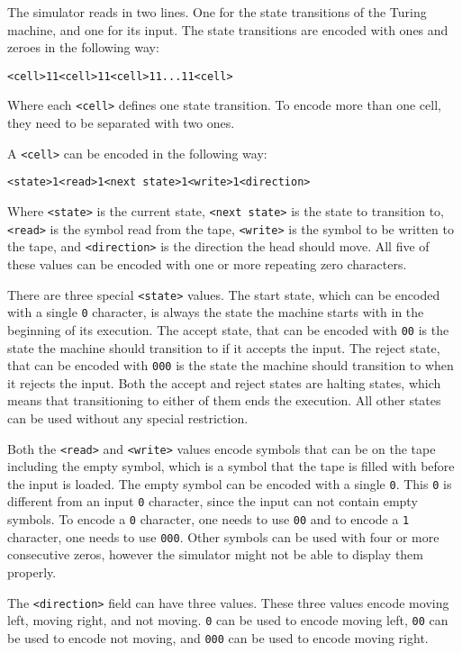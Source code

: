 \documentclass[12pt]{article}
\begin{document}
The simulator reads in two lines. One for the state transitions of the Turing
machine, and one for its input. The state transitions are encoded with ones and
zeroes in the following way:
\lstset{frame=none}
\lstset{numbers=none}
\begin{lstlisting}
<cell>11<cell>11<cell>11...11<cell>
\end{lstlisting}
Where each \verb$<cell>$ defines one state transition. To encode more than one
cell, they need to be separated with two ones.

A \verb$<cell>$ can be encoded in the following way:
\begin{lstlisting}
<state>1<read>1<next state>1<write>1<direction>
\end{lstlisting}
Where \verb$<state>$ is the current state, \verb$<next state>$ is the state to
transition to, \verb$<read>$ is the symbol read from the tape, \verb$<write>$ is
the symbol to be written to the tape, and \verb$<direction>$ is the direction
the head should move. All five of these values can be encoded with one or more
repeating zero characters.

There are three special \verb$<state>$ values. The start state, which can be
encoded with a single \verb$0$ character, is always the state the machine starts
with in the beginning of its execution. The accept state, that can be encoded
with \verb$00$ is the state the machine should transition to if it accepts the
input. The reject state, that can be encoded with \verb$000$ is the state the
machine should transition to when it rejects the input. Both the accept and
reject states are halting states, which means that transitioning to either of
them ends the execution. All other states can be used without any special 
restriction.

Both the \verb$<read>$ and \verb$<write>$ values encode symbols that can be on
the tape including the empty symbol, which is a symbol that the tape is filled
with before the input is loaded. The empty symbol can be encoded with a single
\verb$0$. This \verb$0$ is different from an input \verb$0$ character, since the
input can not contain empty symbols. To encode a \verb$0$ character, one needs
to use \verb$00$ and to encode a \verb$1$ character, one needs to use
\verb$000$. Other symbols can be used with four or more consecutive zeros,
however the simulator might not be able to display them properly.

The \verb$<direction>$ field can have three values. These three values encode
moving left, moving right, and not moving. \verb$0$ can be used to encode moving
left, \verb$00$ can be used to encode not moving, and \verb$000$ can be used to
encode moving right.
\end{document}
